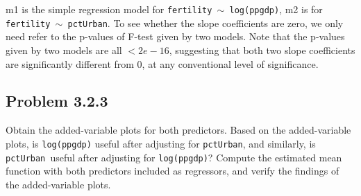 \documentclass[12pt,oneside,a4paper]{article}\usepackage[]{graphicx}\usepackage[]{xcolor}
\newcommand{\subproblem}[1]
{
    \subsection*{Problem {#1}}
}
\newcommand{\m}[1]{\texttt{{#1}}}
\begin{document}
m1 is the simple regression model for \m{fertility $\sim$ log(ppgdp)}, m2 is for \m{fertility $\sim$ pctUrban}. To see whether the slope coefficients are zero, we only need refer to the p-values of F-test given by two models. Note that the p-values given by two models are all $<2e-16$, suggesting that both two slope coefficients are significantly different from 0, at any conventional level of significance.

\subproblem{3.2.3}
Obtain the added-variable plots for both predictors. Based on the added-variable plots, is \m{log(ppgdp)} useful after adjusting for \m{pctUrban}, and similarly, is \m{pctUrban }useful after adjusting for \m{log(ppgdp)}? Compute the estimated mean function with both predictors included as regressors, and verify the findings of the added-variable plots.
\end{document}
